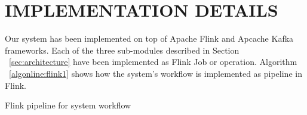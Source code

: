 \section{IMPLEMENTATION DETAILS}

Our system has been implemented on top of Apache Flink and Apcache Kafka frameworks. Each of the three sub-modules described in Section  ~\ref{sec:architecture} have been implemented as Flink Job or operation. Algorithm ~\ref{algonline:flink1} shows how the system's workflow  is implemented as pipeline in Flink.

\begin{algorithm}
	\caption{Flink pipeline for system workflow} 
	\begin{algorithmic}[1] 
		\Statex  
		
	\end{algorithmic}
	\label{algonline:flink1}
\end{algorithm}